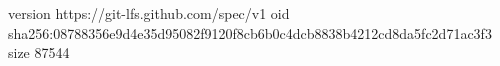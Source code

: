 version https://git-lfs.github.com/spec/v1
oid sha256:08788356e9d4e35d95082f9120f8cb6b0c4dcb8838b4212cd8da5fc2d71ac3f3
size 87544
